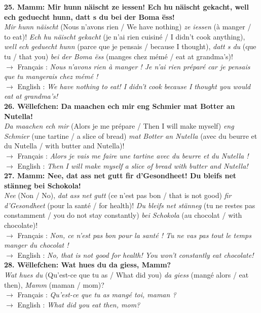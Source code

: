 \noindent\textbf{25. Mamm: Mir hunn näischt ze iessen! Ech hu näischt gekacht, well ech geduecht hunn, datt s du bei der Boma ëss!}\\
\textit{Mir hunn näischt} (Nous n'avons rien / We have nothing) \textit{ze iessen} (à manger / to eat)! \textit{Ech hu näischt gekacht} (je n'ai rien cuisiné / I didn't cook anything), \textit{well ech geduecht hunn} (parce que je pensais / because I thought), \textit{datt s du} (que tu / that you) \textit{bei der Boma ëss} (manges chez mémé / eat at grandma's)!\\
$\rightarrow$ Français : \textit{Nous n'avons rien à manger ! Je n'ai rien préparé car je pensais que tu mangerais chez mémé !}\\
$\rightarrow$ English : \textit{We have nothing to eat! I didn't cook because I thought you would eat at grandma's!}\\[0.5em]

\noindent\textbf{26. Wëllefchen: Da maachen ech mir eng Schmier mat Botter an Nutella!}\\
\textit{Da maachen ech mir} (Alors je me prépare / Then I will make myself) \textit{eng Schmier} (une tartine / a slice of bread) \textit{mat Botter an Nutella} (avec du beurre et du Nutella / with butter and Nutella)!\\
$\rightarrow$ Français : \textit{Alors je vais me faire une tartine avec du beurre et du Nutella !}\\
$\rightarrow$ English : \textit{Then I will make myself a slice of bread with butter and Nutella!}\\[0.5em]

\noindent\textbf{27. Mamm: Nee, dat ass net gutt fir d'Gesondheet! Du bleifs net stänneg bei Schokola!}\\
\textit{Nee} (Non / No), \textit{dat ass net gutt} (ce n'est pas bon / that is not good) \textit{fir d'Gesondheet} (pour la santé / for health)! \textit{Du bleifs net stänneg} (tu ne restes pas constamment / you do not stay constantly) \textit{bei Schokola} (au chocolat / with chocolate)!\\
$\rightarrow$ Français : \textit{Non, ce n'est pas bon pour la santé ! Tu ne vas pas tout le temps manger du chocolat !}\\
$\rightarrow$ English : \textit{No, that is not good for health! You won't constantly eat chocolate!}\\[0.5em]

\noindent\textbf{28. Wëllefchen: Wat hues du da giess, Mamm?}\\
\textit{Wat hues du} (Qu'est-ce que tu as / What did you) \textit{da giess} (mangé alors / eat then), \textit{Mamm} (maman / mom)?\\
$\rightarrow$ Français : \textit{Qu'est-ce que tu as mangé toi, maman ?}\\
$\rightarrow$ English : \textit{What did you eat then, mom?}\\[0.5em]

